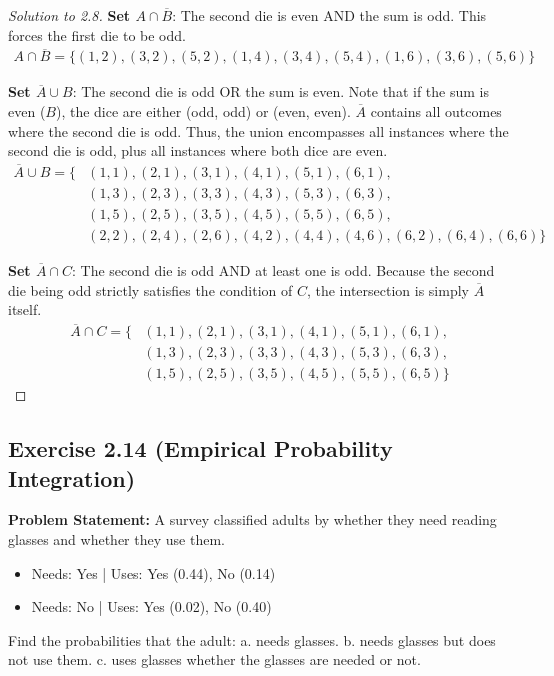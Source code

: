 \documentclass[12pt]{article}
\begin{document}
\begin{proof}[Solution to 2.8]
\noindent \textbf{Set $A \cap \overline{B}$}: The second die is even AND the sum is odd. This forces the first die to be odd.
\begin{align*}
A \cap \overline{B} = \{ (1,2), (3,2), (5,2), (1,4), (3,4), (5,4), (1,6), (3,6), (5,6) \}
\end{align*}

\noindent \textbf{Set $\overline{A} \cup B$}: The second die is odd OR the sum is even. Note that if the sum is even ($B$), the dice are either (odd, odd) or (even, even). $\overline{A}$ contains all outcomes where the second die is odd. Thus, the union encompasses all instances where the second die is odd, plus all instances where both dice are even. 
\begin{align*}
\overline{A} \cup B = \{ &(1,1), (2,1), (3,1), (4,1), (5,1), (6,1), \\
                         &(1,3), (2,3), (3,3), (4,3), (5,3), (6,3), \\
                         &(1,5), (2,5), (3,5), (4,5), (5,5), (6,5), \\
                         &(2,2), (2,4), (2,6), (4,2), (4,4), (4,6), (6,2), (6,4), (6,6) \}
\end{align*}

\noindent \textbf{Set $\overline{A} \cap C$}: The second die is odd AND at least one is odd. Because the second die being odd strictly satisfies the condition of $C$, the intersection is simply $\overline{A}$ itself.
\begin{align*}
\overline{A} \cap C = \{ &(1,1), (2,1), (3,1), (4,1), (5,1), (6,1), \\
                         &(1,3), (2,3), (3,3), (4,3), (5,3), (6,3), \\
                         &(1,5), (2,5), (3,5), (4,5), (5,5), (6,5) \}
\end{align*}
\end{proof}

\subsection*{Exercise 2.14 (Empirical Probability Integration)}
\textbf{Problem Statement:} A survey classified adults by whether they need reading glasses and whether they use them. 
\begin{itemize}
    \item Needs: Yes | Uses: Yes (0.44), No (0.14)
    \item Needs: No | Uses: Yes (0.02), No (0.40)
\end{itemize}
Find the probabilities that the adult:
a. needs glasses. 
b. needs glasses but does not use them. 
c. uses glasses whether the glasses are needed or not.
\end{document}
